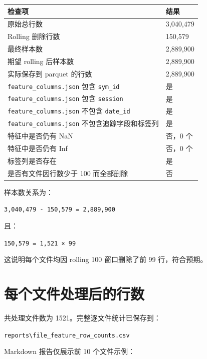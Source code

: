 \documentclass[UTF8,a4paper,12pt]{ctexart}
\begin{document}
\begin{longtable}{p{8cm}p{5cm}}
\toprule
\textbf{检查项} & \textbf{结果} \\
\midrule
原始总行数 & 3,040,479 \\
Rolling 删除行数 & 150,579 \\
最终样本数 & 2,889,900 \\
期望 rolling 后样本数 & 2,889,900 \\
实际保存到 parquet 的行数 & 2,889,900 \\
\texttt{feature\_columns.json} 包含 \texttt{sym\_id} & 是 \\
\texttt{feature\_columns.json} 包含 \texttt{session} & 是 \\
\texttt{feature\_columns.json} 不包含 \texttt{date\_id} & 是 \\
\texttt{feature\_columns.json} 不包含追踪字段和标签列 & 是 \\
特征中是否仍有 NaN & 否，0 个 \\
特征中是否仍有 Inf & 否，0 个 \\
标签列是否存在 & 是 \\
是否有文件因行数少于 100 而全部删除 & 否 \\
\bottomrule
\end{longtable}

样本数关系为：

\begin{center}
\texttt{3,040,479 - 150,579 = 2,889,900}
\end{center}

且：

\begin{center}
\texttt{150,579 = 1,521 × 99}
\end{center}

这说明每个文件均因 rolling 100 窗口删除了前 99 行，符合预期。

\section{每个文件处理后的行数}

共处理文件数为 1521。完整逐文件统计已保存到：

\begin{center}
\texttt{reports\textbackslash file\_feature\_row\_counts.csv}
\end{center}

Markdown 报告仅展示前 10 个文件示例：
\end{document}
